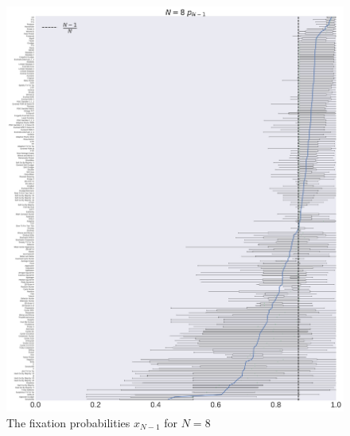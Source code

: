\documentclass[10pt,letterpaper]{article}
\begin{document}
\begin{figure}[!hbtp]
    \centering
    \includegraphics[width=\textwidth]{./boxplot_8_resist.pdf}
    \caption{The fixation probabilities \(x_{N-1}\) for \(N=8\)}
\end{figure}
\end{document}
